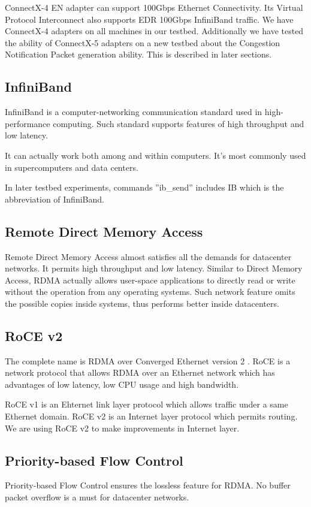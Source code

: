 \documentclass[12pt,a4paper]{article}
\begin{document}
ConnectX-4 EN adapter can support 100Gbps Ethernet Connectivity.
Its Virtual Protocol Interconnect also supports EDR 100Gbps InfiniBand traffic.
We have ConnectX-4 adapters on all machines in our testbed.
Additionally we have tested the ability of ConnectX-5 adapters on a new testbed about the Congestion Notification Packet generation
ability.
This is described in later sections.

\subsection{InfiniBand}

InfiniBand is a computer-networking communication standard used in high-performance computing.
Such standard supports features of high throughput and low latency.

It can actually work both among and within computers. It's most commonly used in supercomputers and data centers.

In later testbed experiments, commands ''ib\_send'' includes IB which is the abbreviation of InfiniBand.

\subsection{Remote Direct Memory Access}
Remote Direct Memory Access almost satisfies all the demands for datacenter networks.
It permits high throughput and low latency.
Similar to Direct Memory Access, RDMA actually allows user-space applications to directly read or write without the operation from
any operating systems.
Such network feature omits the possible copies inside systems, thus performs better inside datacenters.

\subsection{RoCE v2}

The complete name is RDMA over Converged Ethernet version 2 \cite{RoCEv2}.
RoCE is a network protocol that allows RDMA over an Ethernet network
which has advantages of low latency, low CPU usage and high bandwidth.

RoCE v1 is an Ehternet link layer protocol which allows traffic under a same Ethernet domain.
RoCE v2 is an Internet layer protocol which permits routing.
We are using RoCE v2 to make improvements in Internet layer.

\subsection{Priority-based Flow Control}
Priority-based Flow Control ensures the lossless feature for RDMA.
No buffer packet overflow is a must for datacenter networks.
\end{document}
